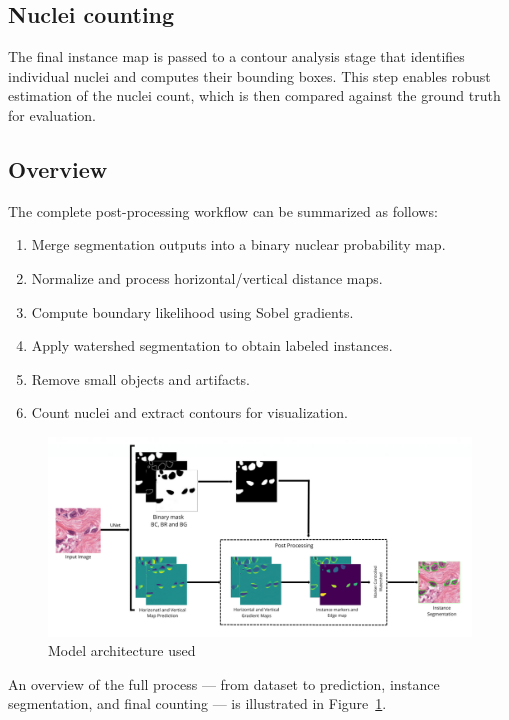 \documentclass[target=bach,aauheader=,style=]{thud}
\begin{document}
\subsection{Nuclei counting}
The final instance map is passed to a contour analysis stage that identifies individual nuclei and computes their bounding boxes. 
This step enables robust estimation of the nuclei count, which is then compared against the ground truth for evaluation.

\subsection{Overview}
The complete post-processing workflow can be summarized as follows:
\begin{enumerate}
    \item Merge segmentation outputs into a binary nuclear probability map.
    \item Normalize and process horizontal/vertical distance maps.
    \item Compute boundary likelihood using Sobel gradients.
    \item Apply watershed segmentation to obtain labeled instances.
    \item Remove small objects and artifacts.
    \item Count nuclei and extract contours for visualization.
\end{enumerate}
\begin{figure}[H] %
    \centering
    \includegraphics[width=1\textwidth]{imgs/overall.png}
    \caption{Model architecture used}
    \label{fig:postproc_overview}
\end{figure}
An overview of the full process --- from dataset to prediction, instance segmentation, and final counting --- is illustrated in Figure~\ref{fig:postproc_overview}.
\end{document}
